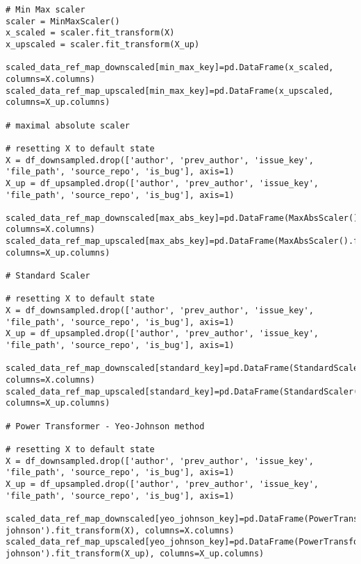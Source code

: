 \begin{landscape}
\begin{code}
\label{code:scalers:execute-scalers}
\begin{verbatim}
# Min Max scaler
scaler = MinMaxScaler()
x_scaled = scaler.fit_transform(X)
x_upscaled = scaler.fit_transform(X_up)

scaled_data_ref_map_downscaled[min_max_key]=pd.DataFrame(x_scaled, columns=X.columns)
scaled_data_ref_map_upscaled[min_max_key]=pd.DataFrame(x_upscaled, columns=X_up.columns)

# maximal absolute scaler

# resetting X to default state
X = df_downsampled.drop(['author', 'prev_author', 'issue_key', 'file_path', 'source_repo', 'is_bug'], axis=1)
X_up = df_upsampled.drop(['author', 'prev_author', 'issue_key', 'file_path', 'source_repo', 'is_bug'], axis=1)

scaled_data_ref_map_downscaled[max_abs_key]=pd.DataFrame(MaxAbsScaler().fit_transform(X), columns=X.columns)
scaled_data_ref_map_upscaled[max_abs_key]=pd.DataFrame(MaxAbsScaler().fit_transform(X_up), columns=X_up.columns)

# Standard Scaler

# resetting X to default state
X = df_downsampled.drop(['author', 'prev_author', 'issue_key', 'file_path', 'source_repo', 'is_bug'], axis=1)
X_up = df_upsampled.drop(['author', 'prev_author', 'issue_key', 'file_path', 'source_repo', 'is_bug'], axis=1)

scaled_data_ref_map_downscaled[standard_key]=pd.DataFrame(StandardScaler(with_mean=False).fit_transform(X), columns=X.columns)
scaled_data_ref_map_upscaled[standard_key]=pd.DataFrame(StandardScaler(with_mean=False).fit_transform(X_up), columns=X_up.columns)

# Power Transformer - Yeo-Johnson method

# resetting X to default state
X = df_downsampled.drop(['author', 'prev_author', 'issue_key', 'file_path', 'source_repo', 'is_bug'], axis=1)
X_up = df_upsampled.drop(['author', 'prev_author', 'issue_key', 'file_path', 'source_repo', 'is_bug'], axis=1)

scaled_data_ref_map_downscaled[yeo_johnson_key]=pd.DataFrame(PowerTransformer(method='yeo-johnson').fit_transform(X), columns=X.columns)
scaled_data_ref_map_upscaled[yeo_johnson_key]=pd.DataFrame(PowerTransformer(method='yeo-johnson').fit_transform(X_up), columns=X_up.columns)



\end{verbatim}
\end{code}
\end{landscape}
